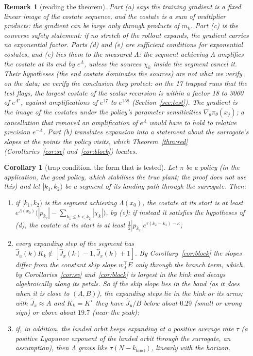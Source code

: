 \documentclass[11pt]{article}
\theoremstyle{plainnote}
\newtheorem{corollary}{Corollary}
\newtheorem{remark}{Remark}
\newcommand{\Jx}{\hat J_x}
\newcommand{\Ju}{\hat J_u}
\begin{document}
\begin{remark}[reading the theorem]
Part (a) says the training gradient is a fixed linear image of the costate sequence, and the costate is a sum of multiplier products: the gradient can be large only through products of $m_k$. Part (c) is the converse safety statement: if no stretch of the rollout expands, the gradient carries no exponential factor. Parts (d) and (e) are sufficient conditions for exponential costates, and (e) ties them to the measured $\Lambda$: the segment achieving $\Lambda$ amplifies the costate at its end by $e^{\Lambda}$, unless the sources $\chi_k$ inside the segment cancel it. Their hypotheses (the end costate dominates the sources) are not what we verify on the data; we verify the conclusion they protect: on the 17 trapped runs that the test flags, the largest costate of the scalar recursion is within a factor 18 to 3000 of $e^{\Lambda^\star}$, against amplifications of $e^{17}$ to $e^{158}$ (Section~\ref{sec:test}). The gradient is the image of the costates under the policy's parameter sensitivities $\nabla_\theta\pi_\theta(x_j)$; a cancellation that removed an amplification of $e^{\Lambda}$ would have to hold to relative precision $e^{-\Lambda}$. Part (b) translates expansion into a statement about the surrogate's slopes at the points the policy visits, which Theorem~\ref{thm:red} (Corollaries~\ref{cor:sv} and~\ref{cor:block}) locates.
\end{remark}

\begin{corollary}[trap condition, the form that is tested]\label{cor:trap}
Let $\pi$ be a policy (in the application, the good policy, which stabilises the true plant; the proof does not use this) and let $[k_1,k_2)$ be a segment of its landing path through the surrogate. Then:
\begin{enumerate}
\item[(i)] if $[k_1,k_2)$ is the segment achieving $\Lambda(x_0)$, the costate at its start is at least $e^{\Lambda(x_0)}\big(|p_{k_2}|-\sum_{k_1\le k<k_2}|\chi_k|\big)$, by (e); if instead it satisfies the hypotheses of (d), the costate at its start is at least $\frac12|p_{k_2}|e^{\tau(k_2-k_1)-\kappa}$;
\item[(ii)] every expanding step of the segment has $\Ju(k)K_k\notin[\Jx(k)-1,\Jx(k)+1]$. By Corollary~\ref{cor:block} the slopes differ from the constant skip slope $w_d^\top E$ only through the branch term, which by Corollaries~\ref{cor:sv} and~\ref{cor:block} is largest in the kink and decays algebraically along its petals. So if the skip slope lies in the band (as it does when it is close to $(A,B)$), the expanding steps lie in the kink or its arms; with $\Jx\approx A$ and $K_k=K^\star$ they have $\Ju/B$ below about $0.29$ (small or wrong sign) or above about $19.7$ (near the peak);
\item[(iii)] if, in addition, the landed orbit keeps expanding at a positive average rate $\tau$ (a positive Lyapunov exponent of the landed orbit through the surrogate, an assumption), then $\Lambda$ grows like $\tau(N-k_{\mathrm{land}})$, linearly with the horizon.
\end{enumerate}
\end{corollary}
\end{document}
